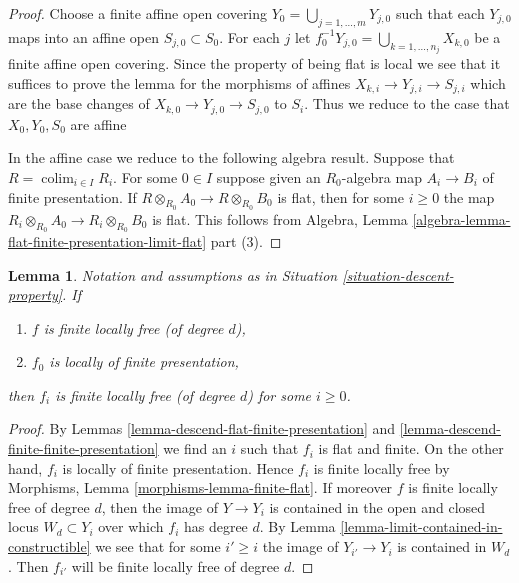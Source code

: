 \documentclass{stacks-project}
\theoremstyle{plain}
\newtheorem{lemma}[subsection]{Lemma}
\theoremstyle{definition}
\theoremstyle{remark}
\numberwithin{equation}{subsection}
\def\colim{\mathop{\mathrm{colim}}\nolimits}
\begin{document}
\begin{proof}
Choose a finite affine open covering
$Y_0 = \bigcup_{j = 1, \ldots, m} Y_{j, 0}$
such that each $Y_{j, 0}$ maps into an affine open
$S_{j, 0} \subset S_0$. For each $j$ let
$f_0^{-1}Y_{j, 0} = \bigcup_{k = 1, \ldots, n_j} X_{k, 0}$ be a
finite affine open covering. Since the property of being flat is
local we see that it suffices to prove the lemma for the morphisms
of affines $X_{k, i} \to Y_{j, i} \to S_{j, i}$ which are the base
changes of $X_{k, 0} \to Y_{j, 0} \to S_{j, 0}$ to $S_i$.
Thus we reduce to the case that $X_0, Y_0, S_0$ are affine

\medskip\noindent
In the affine case we reduce to the following algebra result.
Suppose that $R = \colim_{i \in I} R_i$. For some $0 \in I$
suppose given an $R_0$-algebra map $A_i \to B_i$ of finite presentation.
If $R \otimes_{R_0} A_0 \to R \otimes_{R_0} B_0$ is flat, then
for some $i \geq 0$ the map
$R_i \otimes_{R_0} A_0 \to R_i \otimes_{R_0} B_0$ is flat.
This follows from Algebra,
Lemma \ref{algebra-lemma-flat-finite-presentation-limit-flat} part (3).
\end{proof}

\begin{lemma}
\label{lemma-descend-finite-locally-free}
Notation and assumptions as in Situation \ref{situation-descent-property}.
If
\begin{enumerate}
\item $f$ is finite locally free (of degree $d$),
\item $f_0$ is locally of finite presentation,
\end{enumerate}
then $f_i$ is finite locally free (of degree $d$) for some $i \geq 0$.
\end{lemma}

\begin{proof}
By
Lemmas \ref{lemma-descend-flat-finite-presentation} and
\ref{lemma-descend-finite-finite-presentation}
we find an $i$ such that $f_i$ is flat and finite.
On the other hand, $f_i$ is locally of finite presentation.
Hence $f_i$ is finite locally free by
Morphisms, Lemma \ref{morphisms-lemma-finite-flat}.
If moreover $f$ is finite locally free of degree $d$,
then the image of $Y \to Y_i$ is contained in the
open and closed locus $W_d \subset Y_i$ over which $f_i$ has degree
$d$. By
Lemma \ref{lemma-limit-contained-in-constructible}
we see that for some $i' \geq i$ the image of $Y_{i'} \to Y_i$
is contained in $W_d$.
Then $f_{i'}$ will be finite locally free of degree $d$.
\end{proof}
\end{document}
